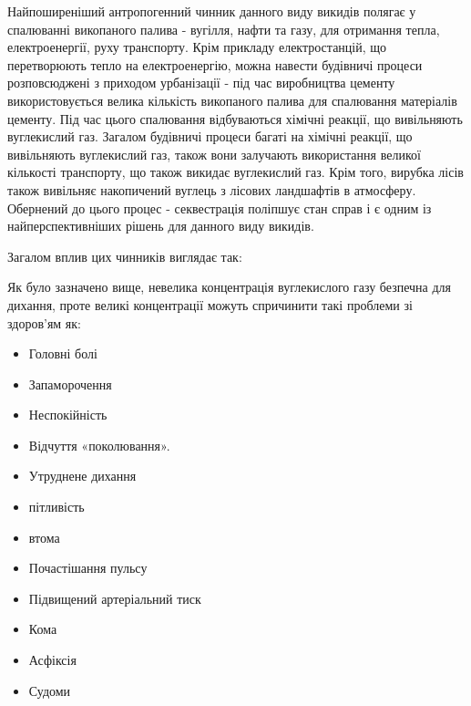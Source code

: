 Найпоширеніший антропогенний чинник данного виду викидів полягає у спалюванні викопаного палива - вугілля, нафти та газу, для отримання тепла, електроенергії, руху транспорту.
Крім прикладу електростанцій, що перетворюють тепло на електроенергію, можна навести будівничі процеси розповсюджені з приходом урбанізації - під час виробництва цементу використовується велика кількість викопаного палива для спалювання матеріалів цементу. 
Під час цього спалювання відбуваються хімічні реакції, що вивільняють вуглекислий газ.
Загалом будівничі процеси багаті на хімічні реакції, що вивільняють вуглекислий газ, також вони залучають використання великої кількості транспорту, що також викидає вуглекислий газ.
Крім того, вирубка лісів також вивільняє накопичений вуглець з лісових ландшафтів в атмосферу. 
Обернений до цього процес - секвестрація поліпшує стан справ і є одним із найперспективніших рішень для данного виду викидів. 

Загалом вплив цих чинників виглядає так:



\begin{center}
\end{center}

\vspace{0.75cm}

Як було зазначено вище, невелика концентрація вуглекислого газу безпечна для дихання, проте великі концентрації можуть спричинити такі проблеми зі здоров'ям як: 


\begin{multicols}{2}
    \begin{itemize}
        \item Головні болі
        \item Запаморочення
        \item Неспокійність
        \item Відчуття «поколювання».
        \item Утруднене дихання
        \item пітливість
        \item втома
        \item Почастішання пульсу
        \item Підвищений артеріальний тиск
        \item Кома
        \item Асфіксія
        \item Судоми
    \end{itemize}
\end{multicols}
    

